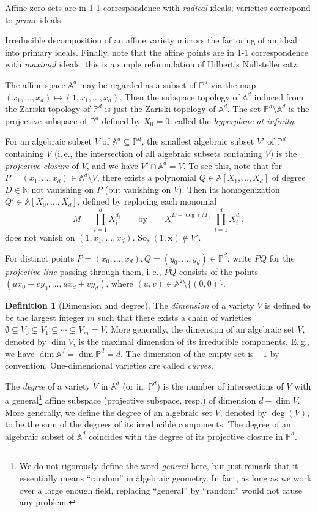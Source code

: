 \documentclass[11pt]{article}
\numberwithin{equation}{section}
\theoremstyle{definition}
\newtheorem{definition}[theorem]{Definition}
\theoremstyle{plain}
\newcommand{\N}{\mathbb N}
\newcommand{\ie}{i.\,e.}
\newcommand{\Eg}{E.\,g.}
\newcommand{\aff}{\mathbb{A}}
\newcommand{\proj}{\mathbb{P}}
\begin{document}
%
%
Affine zero sets are in 1-1 correspondence with \emph{radical} ideals;
varieties correspond to \emph{prime} ideals.

Irreducible decomposition of an affine variety mirrors the factoring of an ideal into primary ideals.  Finally, note that the affine points are in 1-1 correspondence with \emph{maximal} ideals; this is a simple reformulation of Hilbert's Nullstellensatz.


\smallskip
The affine space $\aff^d$ may be regarded as a subset of $\proj^d$ via the map $(x_1,\dots,x_d)\mapsto (1,x_1,\dots,x_d)$. 
Then the subspace topology of $\aff^d$ induced from the Zariski topology of $\proj^d$ is just the Zariski topology of $\aff^d$.
The set $\proj^d\setminus \aff^d$ is the projective subspace of $\proj^d$ defined by $X_0=0$, called the \emph{hyperplane at infinity}.
 
For an algebraic subset $V$ of $\aff^d\subseteq\proj^d$, the smallest algebraic subset $V'$ of $\proj^d$ containing $V$ (\ie, the intersection of all algebraic subsets containing $V$) is the \emph{projective closure} of $V$, and we have $V'\cap \aff^d=V$. To see this, note that for $P=(x_1,\dots,x_d)\in \aff^d\setminus V$, there exists a polynomial $Q\in\aff[X_1,\dots,X_d]$ of degree $D\in\N$ not vanishing on $P$ (but vanishing on $V$). Then its homogenization $Q'\in\aff[X_0,\dots,X_d]$, defined by replacing each monomial
\[
  M=\prod_{i=1}^d X_i^{d_i}\qquad\text{by}\qquad  X_0^{D-\deg(M)}\prod_{i=1}^d X_i^{d_i},
\]
does not vanish on $(1,x_1,\dots,x_d)$. So, $(1,\mathbf x)\notin V'$.

\smallskip
For distinct points $P=(x_0,\dots,x_d), Q=(y_0,\dots,y_d)\in\proj^d$, write $\overline{PQ}$ for the \emph{projective line} passing through them, \ie, $\overline{PQ}$ consists of the points $(ux_0+vy_0,\dots, ux_d+vy_d)$, where $(u,v)\in\aff^2\setminus\{(0,0)\}$. 

%
\begin{definition}[Dimension and degree]  %
The \emph{dimension} of a variety $V$ is defined to be the largest integer $m$ such that there exists a chain of varieties $\emptyset\subsetneq V_0\subsetneq V_1\subsetneq\cdots\subsetneq V_m=V$. More generally, the dimension of an algebraic set $V$, denoted by $\dim V$, is the maximal dimension of its irreducible components. \Eg, we have $\dim\aff^d=\dim\proj^d=d$. 
The dimension of  the  empty set is $-1$ by convention.
%
One-dimensional    %
varieties are called \emph{curves}.

%
The \emph{degree} of a variety $V$ in $\aff^d$
%
(or in~$\proj^d$)   %
is the number of intersections of $V$ with a
%
general\footnote{We do not rigorously define the word \emph{general} here, but just remark that it essentially means ``random'' in algebraic geometry. In fact, as long as we work over a large enough field, replacing ``general'' by ``random'' would not cause any problem.} affine subspace
%
(projective subspace, resp.)  %
of dimension $d-\dim V$. 
More generally, we define the degree of an algebraic set $V$, denoted by $\deg(V)$,  to be the sum of the degrees of its irreducible components.
The degree of an algebraic subset of $\aff^d$ coincides with the degree of its projective closure in $\proj^d$.
\end{definition}
\end{document}
